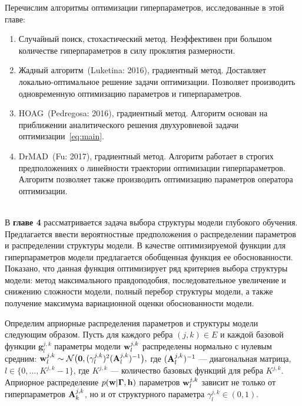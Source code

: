 \documentclass[11pt, a5paper]{dissert}
\theoremstyle{definition}
\begin{document}
{Перечислим алгоритмы оптимизации гиперпараметров, исследованные в этой главе:
\begin{enumerate}
\item Случайный поиск, стохастический метод. Неэффективен при большом количестве гиперпараметров в силу проклятия размерности.
\item Жадный алгоритм~(Luketina: 2016), градиентный метод. Доставляет локально-оптимальное решение задачи оптимизации. Позволяет производить одновременную оптимизацию параметров и гиперпараметров.
\item HOAG~(Pedregosa: 2016), градиентный метод. Алгоритм основан на приближении аналитического решения двухуровневой задачи оптимизации~\eqref{eq:main}.
\item DrMAD~(Fu: 2017), градиентный метод. Алгоритм работает в строгих предположениях о линейности траектории оптимизации гиперпараметров. Алгоритм позволяет также производить оптимизацию параметров оператора оптимизации.
\end{enumerate}

~\\
В \textbf{главе 4}  рассматривается задача выбора структуры модели глубокого обучения. Предлагается ввести вероятностные предположения о распределении параметров и распределении структуры модели. В качестве оптимизируемой функции для гиперпараметров модели предлагается обобщенная функция ее обоснованности. Показано, что данная функция оптимизирует ряд критериев выбора структуры модели: метод максимального правдоподобия, последовательное увеличение и снижению сложности модели, полный перебор структуры модели, а также получение максимума вариационной оценки обоснованности модели.

Определим априорные распределения параметров и структуры модели следующим образом.
Пусть для каждого ребра $(j,k) \in E$ и каждой базовой функции $\mathbf{g}^{j,k}_l$ параметры модели $\mathbf{w}^{j,k}_l$ распределены нормально с нулевым средним:
$
    \mathbf{w}^{j,k}_l \sim \mathcal{N}\bigl(\mathbf{0}, (\gamma^{j,k}_l)^2(\mathbf{A}^{j,k}_l)^{-1}\bigr),
$
где $ (\mathbf{A}^{j,k}_l)^{-1}$ --- диагональная матрица, $l \in \{0,\dots,K^{j,k}-1\}$, где $K^{j,k}$ --- количество базовых функций для ребра $K^{j,k}$. Априорное распределение $p(\mathbf{w}|\boldsymbol{\Gamma}, \mathbf{h})$ параметров $\mathbf{w}^{j,k}_l$ зависит не только от гиперпараметров $\mathbf{A}_k^{j,k}$, но и от структурного параметра $\gamma^{j,k}_l \in (0,1)$.


}
\end{document}

